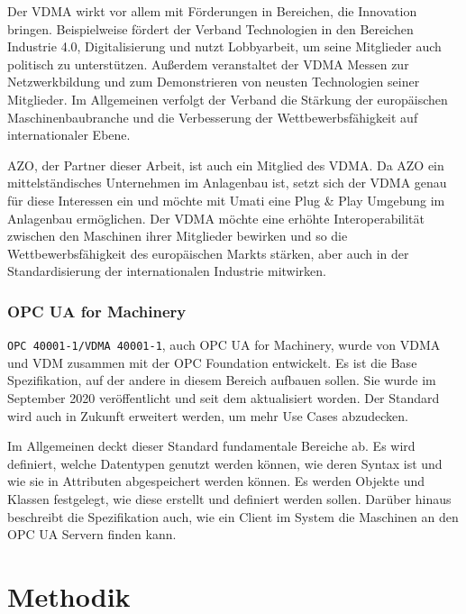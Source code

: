 \documentclass[a4paper, 12pt, oneside]{scrbook}
\begin{document}
		Der VDMA wirkt vor allem mit Förderungen in Bereichen, die Innovation bringen. Beispielweise fördert der Verband Technologien in den Bereichen Industrie 4.0, Digitalisierung und nutzt Lobbyarbeit, um seine Mitglieder auch politisch zu unterstützen. Außerdem veranstaltet der VDMA Messen zur Netzwerkbildung und zum Demonstrieren von neusten Technologien seiner Mitglieder. Im Allgemeinen verfolgt der Verband die Stärkung der europäischen Maschinenbaubranche und die Verbesserung der Wettbewerbsfähigkeit auf internationaler Ebene. \cite{noauthor_themenubersicht_nodate}
		
		AZO, der Partner dieser Arbeit, ist auch ein Mitglied des VDMA. Da AZO ein mittelständisches Unternehmen im Anlagenbau ist, setzt sich der VDMA genau für diese Interessen ein und möchte mit Umati eine Plug \& Play Umgebung im Anlagenbau ermöglichen. Der VDMA möchte eine erhöhte Interoperabilität zwischen den Maschinen ihrer Mitglieder bewirken und so die Wettbewerbsfähigkeit des europäischen Markts stärken, aber auch in der Standardisierung der internationalen Industrie mitwirken. 
		
		\subsection{OPC UA for Machinery}
		
		\texttt{OPC 40001-1/VDMA 40001-1}, auch OPC UA for Machinery, wurde von VDMA und VDM zusammen mit der OPC Foundation entwickelt. Es ist die Base Spezifikation, auf der andere in diesem Bereich aufbauen sollen. Sie wurde im September 2020 veröffentlicht und seit dem aktualisiert worden. Der Standard wird auch in Zukunft erweitert werden, um mehr Use Cases abzudecken.
		
		Im Allgemeinen deckt dieser Standard fundamentale Bereiche ab. Es wird definiert, welche Datentypen genutzt werden können, wie deren Syntax ist und wie sie in Attributen abgespeichert werden können. Es werden Objekte und Klassen festgelegt, wie diese erstellt und definiert werden sollen. Darüber hinaus beschreibt die Spezifikation auch, wie ein Client im System die Maschinen an den OPC UA Servern finden kann. 

\chapter{Methodik}\label{ch:Methodiken}
	
	
\end{document}

